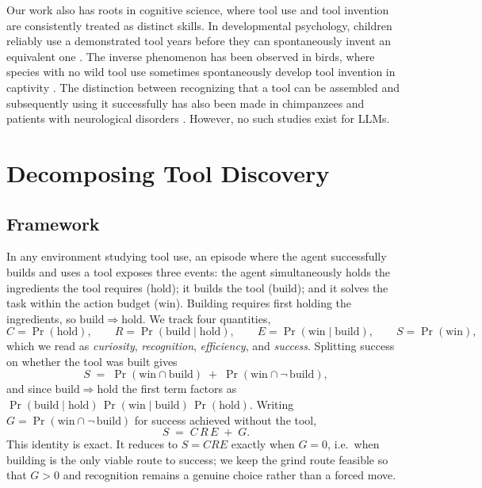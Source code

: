 \documentclass{article}
\begin{document}
Our work also has roots in cognitive science, where tool use and tool invention are consistently
treated as distinct skills. In developmental psychology, children reliably use a demonstrated tool
years before they can spontaneously invent an equivalent one \citep{neldner2020crosscultural}. The inverse phenomenon has been observed in birds, where species with no wild tool use sometimes spontaneously develop tool invention in captivity \citep{bird2009rooks}. The distinction between recognizing that a tool can be assembled and subsequently using it successfully has also been made in chimpanzees \citep{kohler1925mentality} and patients with neurological disorders \citep{osiurak2016tool,osiurak2020technition}. However, no such studies exist for LLMs.

\section{Decomposing Tool Discovery}
\label{sec:framework}

\subsection{Framework}
\label{subsec:framework_sub}

In any environment studying tool use, an episode where the agent successfully
builds and uses a tool exposes three events: the agent simultaneously holds the
ingredients the tool requires ($\mathrm{hold}$); it builds the tool
($\mathrm{build}$); and it solves the task within the action budget
($\mathrm{win}$). Building requires first holding the ingredients, so
$\mathrm{build} \Rightarrow \mathrm{hold}$. We track four quantities,
%
\begin{equation}
  C = \Pr(\mathrm{hold}), \qquad
  R = \Pr(\mathrm{build} \mid \mathrm{hold}), \qquad
  E = \Pr(\mathrm{win} \mid \mathrm{build}), \qquad
  S  = \Pr(\mathrm{win}),
  \label{eq:terms}
\end{equation}
%
which we read as \emph{curiosity}, \emph{recognition}, \emph{efficiency}, and
\emph{success}. Splitting success on whether the tool was built gives
%
\begin{equation}
  S \;=\; \Pr(\mathrm{win} \cap \mathrm{build}) \;+\; \Pr(\mathrm{win} \cap \neg\,\mathrm{build}),
  \label{eq:split}
\end{equation}
%
and since $\mathrm{build} \Rightarrow \mathrm{hold}$ the first term factors as
$\Pr(\mathrm{build}\mid\mathrm{hold})\,\Pr(\mathrm{win}\mid\mathrm{build})\,\Pr(\mathrm{hold})$.
Writing $G = \Pr(\mathrm{win} \cap \neg\,\mathrm{build})$ for success achieved
without the tool,
%
\begin{equation}
  S \;=\; C\,R\,E \;+\; G .
  \label{eq:decomp}
\end{equation}
%
This identity is exact. It reduces to $S = CRE$ exactly when
$G = 0$, i.e.\ when building is the only viable route to success; we keep the
grind route feasible so that $G > 0$ and recognition remains a genuine choice
rather than a forced move.
\end{document}

